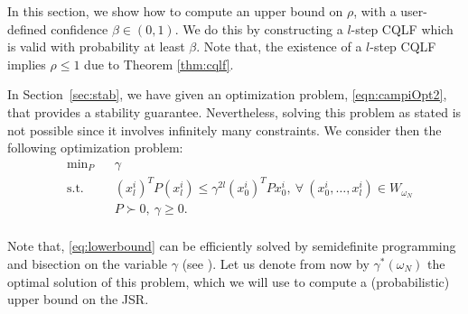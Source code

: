 In this section, we show how to compute an upper bound on $\rho$, with a user-defined confidence $\beta \in (0, 1)$. We do this by constructing a $l$-step CQLF which is valid with probability at least $\beta$. Note that, the existence of a $l$-step CQLF implies $\rho \leq 1$ due to Theorem \ref{thm:cqlf}.

In Section~\ref{sec:stab}, we have given an optimization problem, \eqref{eqn:campiOpt2}, that provides a stability guarantee. Nevertheless, solving this problem as stated is not possible since it involves infinitely many constraints. We consider then the following optimization problem:
\begin{equation}\label{eq:lowerbound}
\begin{aligned}
& \text{min}_P & & \gamma \\
& \text{s.t.} 
&  & (x_l^i)^T P (x_l^i) \leq \gamma^{2l} (x_0^i)^T Px_0^i, \  \forall\ (x_0^i, \dots, x_l^i) \in W_{\omega_N}\\
& && P \succ 0,\ \gamma \geq 0. \\
\end{aligned}
\end{equation}

Note that, \eqref{eq:lowerbound} can be efficiently solved by semidefinite programming and bisection on the variable $\gamma$ (see \cite{boyd}). Let us denote from now by $\gamma^*(\omega_N)$ the optimal solution of this problem, which we will use to compute a (probabilistic) upper bound on the JSR.







